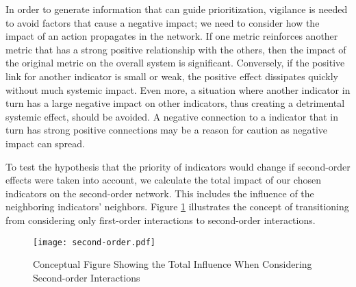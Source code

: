 \documentclass[12pt]{article}  %
\begin{document}
In order to generate information that can guide prioritization, vigilance is needed to avoid factors that cause a negative impact; we need to consider how the impact of an action propagates in the network. If one metric reinforces another metric that has a strong positive relationship with the others, then the impact of the original metric on the overall system is significant. Conversely, if the positive link for another indicator is small or weak, the positive effect dissipates quickly without much systemic impact. Even more, a situation where another indicator in turn has a large negative impact on other indicators, thus creating a detrimental systemic effect, should be avoided.
A negative connection to a indicator that in turn has strong positive connections may be a reason for caution as negative impact can spread.


To test the hypothesis that the priority of indicators would change if second-order effects were taken into account, we calculate the total impact of our chosen indicators on the second-order network. This includes the influence of the neighboring indicators' neighbors. Figure \ref{fig:4.1} illustrates the concept of transitioning from considering only first-order interactions to second-order interactions.

\begin{figure}[htbp]
\centering
\texttt{[image: second-order.pdf]}
\caption{Conceptual Figure Showing the Total Influence  When Considering  Second-order Interactions
}\label{fig:4.1}\vspace{-1.0em}
\end{figure}

\end{document}
